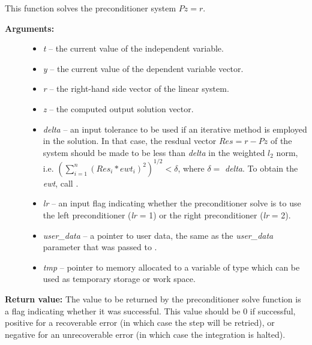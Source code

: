 \documentclass[letterpaper,10pt,english]{sphinxmanual}
\begin{document}
\begin{fulllineitems}
\label{c_interface/User_supplied:c.ARKSpilsMassPrecSolveFn}
This function solves the preconditioner system \(Pz=r\).
\begin{description}
\item[{\textbf{Arguments:}}] \leavevmode\begin{itemize}
\item {} 
\emph{t} -- the current value of the independent variable.

\item {} 
\emph{y} -- the current value of the dependent variable vector.

\item {} 
\emph{r} -- the right-hand side vector of the linear system.

\item {} 
\emph{z} -- the computed output solution vector.

\item {} 
\emph{delta} -- an input tolerance to be used if an iterative method
is employed in the solution.  In that case, the resdual vector
\(Res = r-Pz\) of the system should be made to be less than \emph{delta}
in the weighted \(l_2\) norm, i.e. \(\left(\sum_{i=1}^n
\left(Res_i * ewt_i\right)^2 \right)^{1/2} < \delta\), where \(\delta =\)
\emph{delta}.  To obtain the  \emph{ewt}, call
{\hyperref[c_interface/User_callable:c.ARKodeGetErrWeights]{\emph{}}}.

\item {} 
\emph{lr} -- an input flag indicating whether the preconditioner
solve is to use the left preconditioner (\emph{lr} = 1) or the right
preconditioner (\emph{lr} = 2).

\item {} 
\emph{user\_data} -- a pointer to user data, the same as the
\emph{user\_data} parameter that was passed to {\hyperref[c_interface/User_callable:c.ARKodeSetUserData]{\emph{}}}.

\item {} 
\emph{tmp} -- pointer to memory allocated to a variable of type
 which can be used as temporary storage or work space.

\end{itemize}

\end{description}

\textbf{Return value:}
The value to be returned by the preconditioner solve
function is a flag indicating whether it was successful. This value
should be 0 if successful, positive for a recoverable error (in
which case the step will be retried), or negative for an
unrecoverable error (in which case the integration is halted).

\end{fulllineitems}
\end{document}
